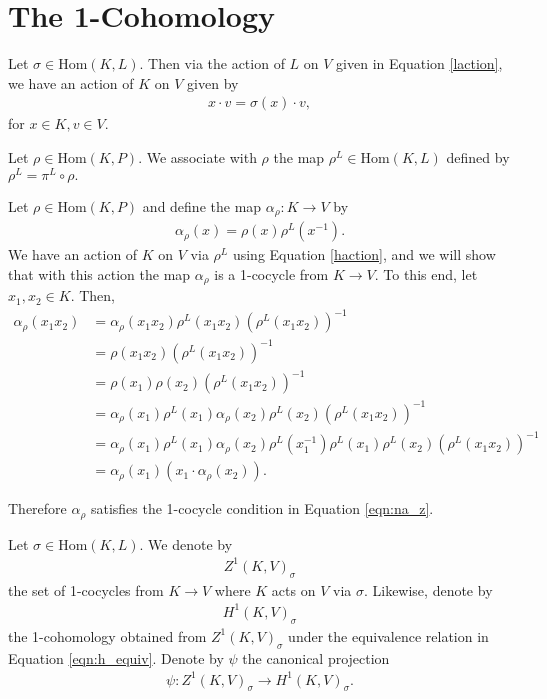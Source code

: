 \section{The 1-Cohomology}
Let $\sigma \in \mathrm{Hom}(K, L)$. Then via the action of $L$ on $V$ given in Equation \ref{laction}, we have an action of $K$ on $V$ given by
\begin{align} \label{haction} x \cdot v = \sigma(x) \cdot v, \end{align}
for $x \in K, v \in V$.

\begin{definition} Let $\rho \in \mathrm{Hom}(K, P)$. We associate with $\rho$ the map $\rho^L \in \mathrm{Hom}(K, L)$ defined by
$\rho^L = \pi^L \circ \rho.$
\end{definition}

Let $\rho \in \mathrm{Hom}(K, P)$ and define the map $\alpha_\rho: K \rightarrow V$ by
\begin{align}\label{rho:alpha}
\alpha_\rho(x) = \rho(x)\rho^L(x^{-1}).
\end{align}
We have an action of $K$ on $V$ via $\rho^L$ using Equation \ref{haction}, and we will show that with this action the map $\alpha_\rho$ is a 1-cocycle from $K \rightarrow V$. To this end, let $x_1, x_2 \in K$.
Then,
\begin{align*} \alpha_\rho(x_1x_2) &= \alpha_\rho(x_1x_2) \rho^L(x_1x_2) \left(\rho^L(x_1x_2)\right)^{-1} \\
	&= \rho(x_1x_2) \left(\rho^L(x_1x_2)\right)^{-1} \\
	&= \rho(x_1) \rho(x_2) \left(\rho^L(x_1x_2)\right)^{-1} \\
	&= \alpha_\rho(x_1) \rho^L(x_1) \alpha_\rho(x_2) \rho^L(x_2) \left(\rho^L(x_1x_2)\right)^{-1} \\
	&= \alpha_\rho(x_1) \rho^L(x_1) \alpha_\rho(x_2) \rho^L(x_1^{-1}) \rho^L(x_1) \rho^L(x_2) \left(\rho^L(x_1x_2)\right)^{-1} \\
	&= \alpha_\rho(x_1) \left(x_1 \cdot \alpha_\rho(x_2)\right). 
\end{align*}

Therefore $\alpha_\rho$ satisfies the 1-cocycle condition in Equation \ref{eqn:na_z}.

\begin{definition}\label{h1sigma} Let $\sigma \in \mathrm{Hom}(K, L)$. We denote by
\begin{align*} Z^1(K, V)_\sigma \end{align*}
the set of 1-cocycles from $K \rightarrow V$ where $K$ acts on $V$ via $\sigma$.
Likewise, denote by
\begin{align*} H^1(K, V)_\sigma \end{align*}
the 1-cohomology obtained from $Z^1(K, V)_\sigma$ under the equivalence relation in Equation \ref{eqn:h_equiv}. Denote by $\psi$ the canonical projection
\begin{align*} \psi : Z^1(K, V)_\sigma \rightarrow H^1(K, V)_\sigma. \end{align*}
\end{definition} 


